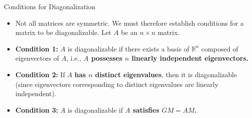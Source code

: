     \begin{frame}{Conditions for Diagonalization}
    \begin{itemize}
    \item  Not all matrices are symmetric. We must therefore establish conditions for a matrix to be diagonalizable. Let $A$ be an $n\times n$ matrix.
      \item \textbf{Condition 1:} \( A \) is diagonalizable if there exists a basis of \( \mathbb{R}^n \) composed of eigenvectors of \( A \), i.e., \textbf{\( A \) possesses \( n \) linearly independent eigenvectors.}

        \item \textbf{Condition 2:} If  $A$ \textbf{has \( n \) distinct eigenvalues}, then it is diagonalizable (since eigenvectors corresponding to distinct eigenvalues are linearly independent).
        \item \textbf{Condition 3: }  $A$ is diagonalizable if   \textbf{$A$ satisfies  $GM=AM$.}
    \end{itemize}
    \end{frame}
